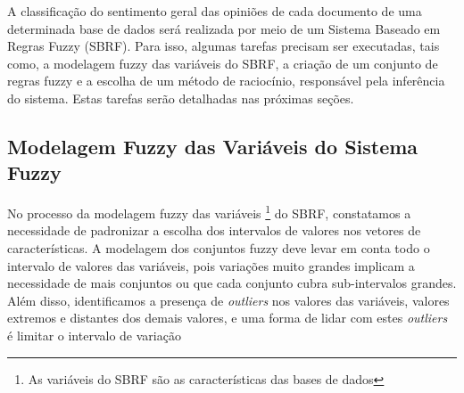 \documentclass[template.tex]{subfiles}
\begin{document}
A classificação do sentimento geral das opiniões de cada documento de uma determinada base de dados será realizada por meio de um Sistema Baseado em Regras Fuzzy (SBRF). Para isso, algumas tarefas precisam ser executadas, tais como, a modelagem fuzzy das variáveis do SBRF, a criação de um conjunto de regras fuzzy e a escolha de um método de raciocínio, responsável pela inferência do sistema. Estas tarefas serão detalhadas nas próximas seções.

\subsection{Modelagem Fuzzy das Variáveis do Sistema Fuzzy}

No processo da modelagem fuzzy das variáveis \footnote{As variáveis do SBRF são as características das bases de dados} do SBRF, constatamos a necessidade de padronizar a escolha dos intervalos de valores nos vetores de características. A modelagem dos conjuntos fuzzy deve levar em conta todo o intervalo de valores das variáveis, pois variações muito grandes implicam a necessidade de mais conjuntos ou que cada conjunto cubra sub-intervalos grandes. Além disso, identificamos a presença de \textit{outliers} nos valores das variáveis, valores extremos e distantes dos demais valores, e uma forma de lidar com estes \textit{outliers} é limitar o intervalo de variação

\end{document}
